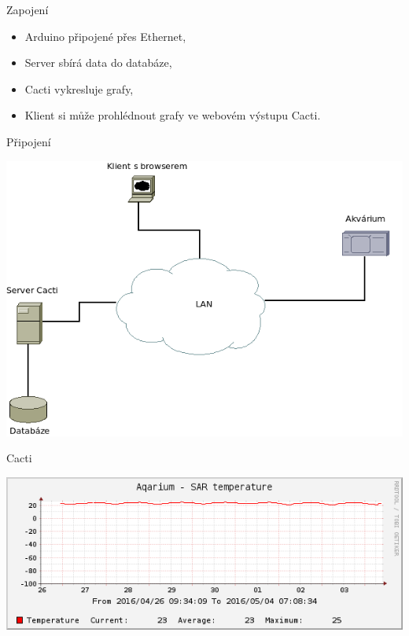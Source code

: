 \documentclass{beamer}
\begin{document}
	\begin{frame}{Zapojení}
		\begin{itemize}
			\item Arduino připojené přes Ethernet,
			\item Server sbírá data do databáze,
			\item Cacti vykresluje grafy,
			\item Klient si může prohlédnout grafy ve webovém výstupu Cacti.	
		\end{itemize}
	\end{frame}
	\begin{frame}{Připojení}
		\begin{center}
			\includegraphics[scale=0.4]{net.png}
		\end{center}
	\end{frame}
	\begin{frame}{Cacti}
		\begin{center}
			\includegraphics[scale=0.5]{graph.png}
		\end{center}
	\end{frame}
\end{document}
